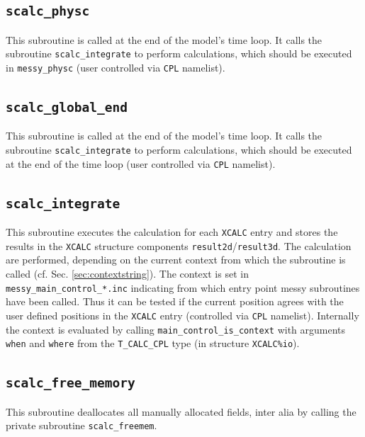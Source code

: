 \documentclass[twoside]{article}
\begin{document}
\subsection{{\tt scalc\_physc}}
\label{sec:scalc_physc}
%
This subroutine is called at the end of the model's time loop.
It calls the subroutine {\tt scalc\_integrate} to perform calculations, which should be executed in {\tt messy\_physc} (user controlled via {\tt CPL} namelist).
%
\subsection{{\tt scalc\_global\_end}}
\label{sec:scalc_global_end}
%
This subroutine is called at the end of the model's time loop.
It calls the subroutine {\tt scalc\_integrate} to perform calculations, which should be executed at the end of the time loop (user controlled via {\tt CPL} namelist).
%
\subsection{{\tt scalc\_integrate}}
\label{sec:scalc_integrate}
%
This subroutine executes the calculation for each {\tt XCALC} entry and stores the results in the {\tt XCALC} structure components {\tt result2d}/{\tt result3d}.
The calculation are performed, depending on the current context from which the subroutine is called (cf. Sec. \ref{sec:contextstring}).
The context is set in {\tt messy\_main\_control\_*.inc} indicating from which entry point messy subroutines have been called.
Thus it can be tested if the current position agrees with the user defined positions in the {\tt XCALC} entry (controlled via {\tt CPL} namelist).
Internally the context is evaluated by calling {\tt main\_control\_is\_context} with arguments {\tt when} and {\tt where} from the {\tt T\_CALC\_CPL} type (in structure {\tt XCALC\%io}).
%
\subsection{{\tt scalc\_free\_memory}}
\label{sec:scalc_free_memory}
%
This subroutine deallocates all manually allocated fields, inter alia by
calling the private subroutine {\tt scalc\_freemem}.
%
\end{document}

